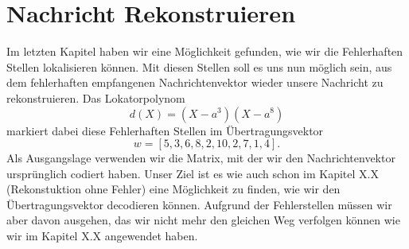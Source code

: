 %
%
%
\section{Nachricht Rekonstruieren
\label{reedsolomon:section:rekonstruktion}}
Im letzten Kapitel haben wir eine Möglichkeit gefunden, wie wir die Fehlerhaften Stellen lokalisieren können.
Mit diesen Stellen soll es uns nun möglich sein, aus dem fehlerhaften empfangenen Nachrichtenvektor wieder unsere Nachricht zu rekonstruieren.
Das Lokatorpolynom
\[
d(X) = (X - a^3)(X-a^8)
\]
markiert dabei diese Fehlerhaften Stellen im Übertragungsvektor
\[
w = [5,3,6,8,2,10,2,7,1,4].
\]
Als Ausgangslage verwenden wir die Matrix, mit der wir den Nachrichtenvektor ursprünglich codiert haben.
Unser Ziel ist es wie auch schon im Kapitel X.X (Rekonstuktion ohne Fehler) eine Möglichkeit zu finden, wie wir den Übertragungsvektor decodieren können. 
Aufgrund der Fehlerstellen müssen wir aber davon ausgehen, das wir nicht mehr den gleichen Weg verfolgen können wie wir im Kapitel X.X angewendet haben.

